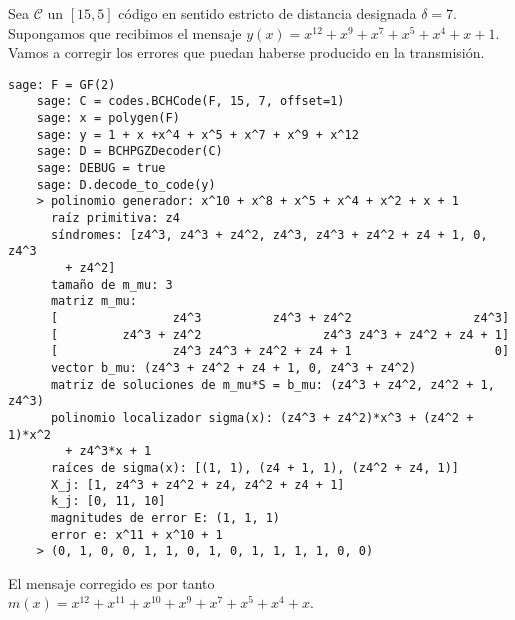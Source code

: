 \begin{example}
  Sea \(\mathcal C\) un \([15, 5]\) código  en sentido estricto de distancia designada \(\delta = 7\).
  Supongamos que recibimos el mensaje \(y(x) = x^{12} + x^9 + x^7 + x^5 + x^4 + x + 1\).
  Vamos a corregir los errores que puedan haberse producido en la transmisión.
  \begin{lstlisting}[gobble=4, breaklines=false, basicstyle=\small\ttfamily]
    sage: F = GF(2)
    sage: C = codes.BCHCode(F, 15, 7, offset=1)
    sage: x = polygen(F)
    sage: y = 1 + x +x^4 + x^5 + x^7 + x^9 + x^12
    sage: D = BCHPGZDecoder(C)
    sage: DEBUG = true
    sage: D.decode_to_code(y)
    > polinomio generador: x^10 + x^8 + x^5 + x^4 + x^2 + x + 1
      raíz primitiva: z4
      síndromes: [z4^3, z4^3 + z4^2, z4^3, z4^3 + z4^2 + z4 + 1, 0, z4^3
        + z4^2]
      tamaño de m_mu: 3
      matriz m_mu: 
      [                z4^3          z4^3 + z4^2                 z4^3]
      [         z4^3 + z4^2                 z4^3 z4^3 + z4^2 + z4 + 1]
      [                z4^3 z4^3 + z4^2 + z4 + 1                    0]
      vector b_mu: (z4^3 + z4^2 + z4 + 1, 0, z4^3 + z4^2)
      matriz de soluciones de m_mu*S = b_mu: (z4^3 + z4^2, z4^2 + 1, z4^3)
      polinomio localizador sigma(x): (z4^3 + z4^2)*x^3 + (z4^2 + 1)*x^2 
        + z4^3*x + 1
      raíces de sigma(x): [(1, 1), (z4 + 1, 1), (z4^2 + z4, 1)]
      X_j: [1, z4^3 + z4^2 + z4, z4^2 + z4 + 1]
      k_j: [0, 11, 10]
      magnitudes de error E: (1, 1, 1)
      error e: x^11 + x^10 + 1
    > (0, 1, 0, 0, 1, 1, 0, 1, 0, 1, 1, 1, 1, 0, 0)
  \end{lstlisting}
  El mensaje corregido es por tanto \(m(x) = x^{12} + x^{11} + x^{10} + x^9 + x^7 + x^5 + x^4 + x\).
\end{example}

